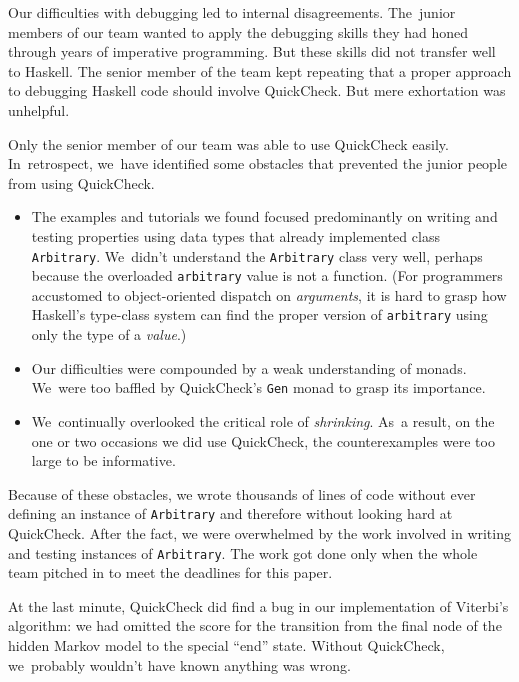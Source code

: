 \documentclass[]{jfp1}
\newcommand\seclabel[1]{\label{sec:#1}}
\begin{document}
Our difficulties with debugging led to internal disagreements.
The~junior members of our team wanted to apply the debugging
skills they had honed through years of imperative programming.
But these skills did not transfer well to Haskell.
The senior member of the team kept repeating that a proper approach to
debugging Haskell code should involve QuickCheck.
But mere exhortation was unhelpful.

\seclabel{awkward-quickcheck}

Only the senior member of our team was able to use
QuickCheck easily.
In~retrospect, we~have identified some obstacles that prevented the
junior people from using
QuickCheck.
\begin{itemize}
\item
The examples and tutorials we found focused 
predominantly on writing and testing properties using data types that
already implemented class \texttt{Arbitrary}.
We~didn't understand the \texttt{Arbitrary} class very well, 
perhaps because the overloaded \texttt{arbitrary} value is not a
function.
(For programmers accustomed to object-oriented dispatch
on \emph{arguments}, it is hard to grasp how Haskell's type-class
system can find the proper version
of \texttt{arbitrary} using only the type of a \emph{value}.)
\item
Our difficulties were compounded by a weak understanding of monads.
We~were too baffled by QuickCheck's \texttt{Gen} monad to grasp its
importance.
\item
We~continually overlooked the critical role of \emph{shrinking}.
As~a result, on the one or two occasions we did 
use QuickCheck, the counterexamples were too large to be
informative. 
\end{itemize}
Because of these obstacles, 
we wrote thousands of lines of code without ever defining an instance
of \texttt{Arbitrary} and therefore
without looking hard at QuickCheck.
After the fact, we were overwhelmed by the work
involved in writing and testing instances
of
\texttt{Arbitrary}.
The work got done only when the whole team pitched in to
meet the deadlines for this paper.

At the last minute, QuickCheck did find
a bug in our implementation of Viterbi's algorithm: we had omitted
the score for the transition from the final node of the hidden
Markov model to the special ``end'' state.
Without QuickCheck, we~probably wouldn't have known anything was wrong.
\end{document}
